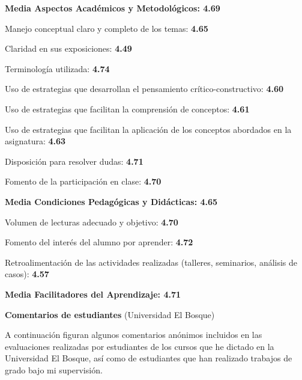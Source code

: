 \documentclass[11pt,a4paper,]{awesome-cv}
\begin{document}
\begin{cventries}
{\begin{cvitems}
\item \textbf{ Media Aspectos Académicos y Metodológicos: 4.69}
\item Manejo conceptual claro y completo de los temas: \textbf{4.65}
\item Claridad en sus exposiciones: \textbf{4.49}
\item Terminología utilizada: \textbf{4.74}
\item Uso de estrategias que desarrollan el pensamiento crítico-constructivo: \textbf{4.60}
\item Uso de estrategias que facilitan la comprensión de conceptos: \textbf{4.61}
\item Uso de estrategias que facilitan la aplicación de los conceptos abordados en la asignatura: \textbf{4.63}
\item Disposición para resolver dudas: \textbf{4.71}
\item Fomento de la participación en clase: \textbf{4.70}
\item \textbf{ Media Condiciones Pedagógicas y Didácticas: 4.65}
\item Volumen de lecturas adecuado y objetivo: \textbf{4.70}
\item Fomento del interés del alumno por aprender: \textbf{4.72}
\item Retroalimentación de las actividades realizadas (talleres, seminarios, análisis de casos): \textbf{4.57}
\item \textbf{Media Facilitadores del Aprendizaje: 4.71}
\end{cvitems}}
\end{cventries}

\blacktriangleright\blacktriangleright\blacktriangleright\space \textbf{Comentarios de estudiantes}
(Universidad El Bosque)

\begin{footnotesize}
A continuación figuran algunos comentarios anónimos incluidos en las evaluaciones realizadas por estudiantes de los cursos que he dictado en la Universidad El Bosque, así como de estudiantes que han realizado trabajos de grado bajo mi supervisión.
\end{footnotesize}
\end{document}
